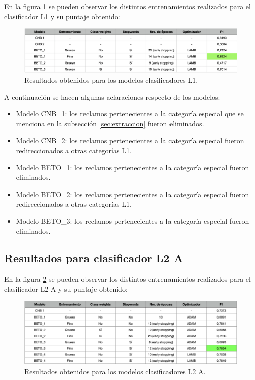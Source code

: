 En la figura \ref{fig:res-l1} se pueden observar los distintos entrenamientos realizados para el clasificador L1 y su puntaje obtenido:

\begin{figure}[htbp]
	\centering
	\includegraphics[width=1\textwidth]{./Figures/cap4-resultados-l1.png}
	\caption{Resultados obtenidos para los modelos clasificadores L1.}
	\label{fig:res-l1}
\end{figure}

A continuación se hacen algunas aclaraciones respecto de los modelos:
\begin{itemize}
	\item Modelo CNB\_1: los reclamos pertenecientes a la categoría especial que se menciona en la subsección \ref{sec:extraccion} fueron eliminados.
	\item Modelo CNB\_2: los reclamos pertenecientes a la categoría especial fueron redireccionados a otras categorías L1.
	\item Modelo BETO\_1: los reclamos pertenecientes a la categoría especial fueron eliminados.
	\item Modelo BETO\_2: los reclamos pertenecientes a la categoría especial fueron redireccionados a otras categorías L1.
	\item Modelo BETO\_3: los reclamos pertenecientes a la categoría especial fueron eliminados.
\end{itemize}

\subsection{Resultados para clasificador L2 A}

En la figura \ref{fig:res-l2a} se pueden observar los distintos entrenamientos realizados para el clasificador L2 A y su puntaje obtenido:

\begin{figure}[htbp]
	\centering
	\includegraphics[width=1\textwidth]{./Figures/cap4-resultados-l2a.png}
	\caption{Resultados obtenidos para los modelos clasificadores L2 A.}
	\label{fig:res-l2a}
\end{figure}

